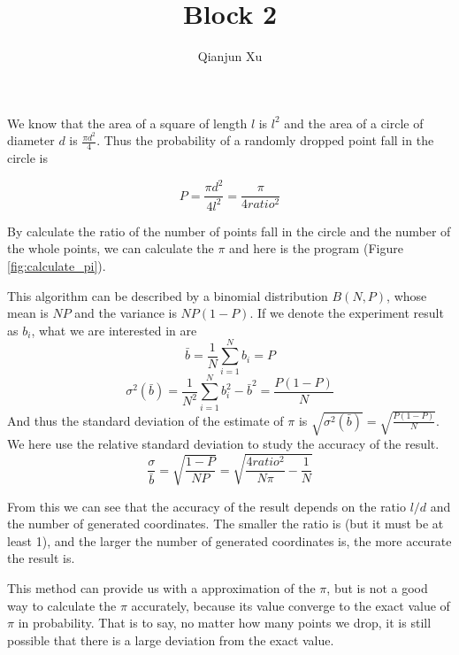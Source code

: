 \documentclass{assignmeownt}
\title{Block 2}
\author{Qianjun Xu}
\date{}
\begin{document}
\maketitle
\thispagestyle{firststyle}
\bigskip



We know that the area of a square of length $l$ is $l^2$ and the area of a circle of diameter $d$ is $\frac{\pi d^2}{4}$. Thus the probability of a randomly dropped point fall in the circle is

$$P=\frac{\pi d^2}{4 l^2}=\frac{\pi}{4 ratio^2}$$


By calculate the ratio of the number of points fall in the circle and the number of the whole points, we can calculate the $\pi$ and here is the program (Figure \ref{fig:calculate_pi}).\\



This algorithm can be described by a binomial distribution $B(N, P)$, whose mean is $NP$ and the variance is $NP(1-P)$. If we denote the experiment result as $b_i$, what we are interested in are
$$
\bar{b}=\frac{1}{N}\sum_{i=1}^N b_i = P
$$
$$
\sigma^2(\bar{b})=\frac{1}{N^2}\sum_{i=1}^N b_i^2 - \bar{b}^2 = \frac{P(1-P)}{N}
$$
And thus the standard deviation of the estimate of $\pi$ is $\sqrt{\sigma^2(\bar{b})}=\sqrt{\frac{P(1-P)}{N}}$. We here use the relative standard deviation to study the accuracy of the result. 
$$
\frac{\sigma}{\bar{b}}=\sqrt{\frac{1-P}{NP}}=\sqrt{\frac{4ratio^2}{N\pi}-\frac{1}{N}}
$$

From this we can see that the accuracy of the result depends on the ratio $l/d$ and the number of generated coordinates. The smaller the ratio is (but it must be at least 1), and the larger the number of generated coordinates is, the more accurate the result is.


This method can provide us with a approximation of the $\pi$, but is not a good way to calculate the $\pi$ accurately, because its value converge to the exact value of $\pi$ in probability. That is to say, no matter how many points we drop, it is still possible that there is a large deviation from the exact value.
\end{document}
